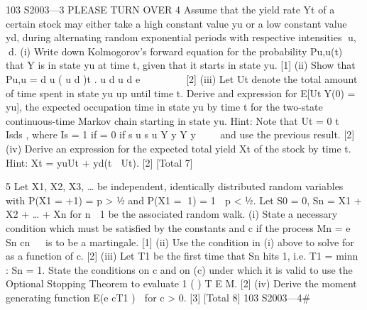
103 S2003—3 PLEASE TURN OVER
4 Assume that the yield rate Yt of a certain stock may either take a high constant value
yu or a low constant value yd, during alternating random exponential periods with
respective intensities u, d.
(i) Write down Kolmogorov’s forward equation for the probability Pu,u(t) that Y
is in state yu at time t, given that it starts in state yu. [1]
(ii) Show that
Pu,u = d u ( u d )t .
u d u d
e    

   
[2]
(iii) Let Ut denote the total amount of time spent in state yu up until time t. Derive
and expression for E[UtY(0) = yu], the expected occupation time in state yu
by time t for the two-state continuous-time Markov chain starting in state yu.
Hint: Note that Ut =
0
t
 Isds , where Is =
1 if =
0 if
s u
s u
Y y
Y y

 
and use the previous
result. [2]
(iv) Derive an expression for the expected total yield Xt of the stock by time t.
Hint: Xt = yuUt + yd(t  Ut). [2]
[Total 7]

5 Let X1, X2, X3, … be independent, identically distributed random variables with
P(X1 = +1) = p > ½ and P(X1 = 1) = 1  p < ½. Let S0 = 0, Sn = X1 + X2 + … + Xn
for n  1 be the associated random walk.
(i) State a necessary condition which must be satisfied by the constants 	 and c if
the process
Mn = e Sn cn  
is to be a martingale. [1]
(ii) Use the condition in (i) above to solve for 	 as a function of c. [2]
(iii) Let T1 be the first time that Sn hits 1, i.e. T1 = min{n : Sn = 1}. State the
conditions on c and on 	(c) under which it is valid to use the Optional
Stopping Theorem to evaluate 1 ( ) T E M. [2]
(iv) Derive the moment generating function E(e cT1 )  for c > 0. [3]
[Total 8]
103 S2003—4#



